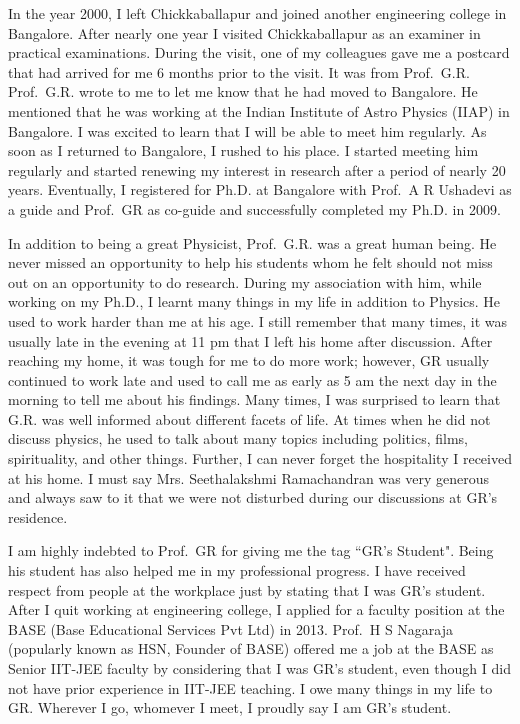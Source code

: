 In the year 2000, I left Chickkaballapur and joined another engineering college in Bangalore. After nearly one year I visited Chickkaballapur as an examiner in practical examinations. During the visit, one of my colleagues gave me a postcard that had arrived for me 6 months prior to the visit. It was from Prof.\ G.R.  Prof.\ G.R. wrote to me to let me know that he had moved to Bangalore. He mentioned that he was working at the Indian Institute of Astro Physics (IIAP) in Bangalore. I was excited to learn that I will be able to meet him regularly. As soon as I returned to Bangalore, I rushed to his place. I started meeting him regularly and started renewing my interest in research after a period of nearly 20 years. Eventually, I registered for Ph.D. at Bangalore with Prof.\ A R Ushadevi as a guide and Prof.\ GR as co-guide and successfully completed my Ph.D. in 2009. 

In addition to being a great Physicist, Prof.\ G.R. was a great human being. He never missed an opportunity to help his students whom he felt should not miss out on an opportunity to do research. During my association with him, while working on my Ph.D., I learnt many things in my life in addition to Physics. He used to work harder than me at his age. I still remember that many times, it was usually late in the evening at 11 pm that I left his home after discussion. After reaching my home, it was tough for me to do more work; however, GR usually continued to work late and used to call me as early as 5 am the next day in the morning to tell me about his findings. Many times, I was surprised to learn that G.R. was well informed about different facets of life. At times when he did not discuss physics, he used to talk about many topics including politics, films, spirituality, and other things. Further, I can never forget the hospitality I received at his home. I must say Mrs. Seethalakshmi Ramachandran was very generous and always saw to it that we were not disturbed during our discussions at GR's residence.

I am highly indebted to Prof.\ GR for giving me the tag ``GR's Student". Being his student has also helped me in my professional progress. I have received respect from people at the workplace just by stating that I was GR's student. After I quit working at engineering college, I applied for a faculty position at the BASE (Base Educational Services Pvt Ltd) in 2013. Prof.\ H S Nagaraja (popularly known as HSN, Founder of BASE) offered me a job at the BASE as Senior IIT-JEE faculty by considering that I was GR's student, even though I did not have prior experience in IIT-JEE teaching. I owe many things in my life to GR. Wherever I go, whomever I meet, I proudly say I am GR's student. 

